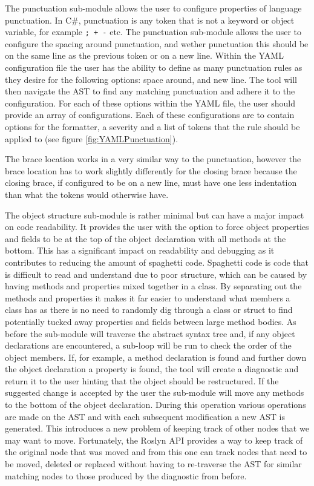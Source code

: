 The punctuation sub-module allows the user to configure properties of language punctuation. In C\#, punctuation is any token that is not a keyword or object variable, for example \texttt{; + -} etc. The punctuation sub-module allows the user to configure the spacing around punctuation, and wether punctuation this should be on the same line as the previous token or on a new line. Within the YAML configuration file the user has the ability to define as many punctuation rules as they desire for the following options: space around, and new line. The tool will then navigate the AST to find any matching punctuation and adhere it to the configuration. For each of these options within the YAML file, the user should provide an array of configurations. Each of these configurations are to contain options for the formatter, a severity and a list of tokens that the rule should be applied to (see figure \ref{fig:YAMLPunctuation}).

The brace location works in a very similar way to the punctuation, however the brace location has to work slightly differently for the closing brace because the closing brace, if configured to be on a new line, must have one less indentation than what the tokens would otherwise have.

The object structure sub-module is rather minimal but can have a major impact on code readability. It provides the user with the option to force object properties and fields to be at the top of the object declaration with all methods at the bottom. This has a significant impact on readability and debugging as it contributes to reducing the amount of spaghetti code. Spaghetti code is code that is difficult to read and understand due to poor structure, which can be caused by having methods and properties mixed together in a class. By separating out the methods and properties it makes it far easier to understand what members a class has as there is no need to randomly dig through a class or struct to find potentially tucked away properties and fields between large method bodies.
As before the sub-module will traverse the abstract syntax tree and, if any object declarations are encountered, a sub-loop will be run to check the order of the object members. If, for example, a method declaration is found and further down the object declaration a property is found, the tool will create a diagnostic and return it to the user hinting that the object should be restructured. If the suggested change is accepted by the user the sub-module will move any methods to the bottom of the object declaration. During this operation various operations are made on the AST and with each subsequent modification a new AST is generated. This introduces a new problem of keeping track of other nodes that we may want to move. Fortunately, the Roslyn API provides a way to keep track of the original node that was moved and from this one can track nodes that need to be moved, deleted or replaced without having to re-traverse the AST for similar matching nodes to those produced by the diagnostic from before.

